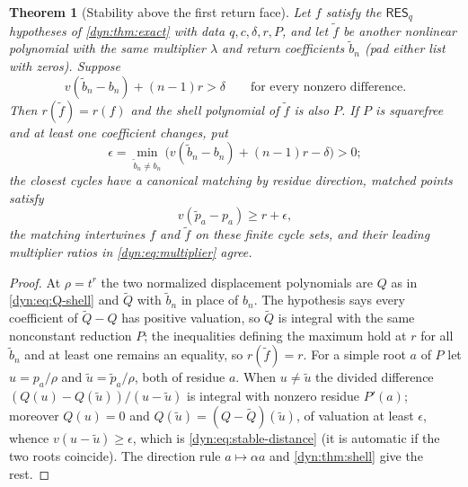 \documentclass[11pt,letterpaper]{article}
\newtheorem{theorem}{Theorem}[section]
\theoremstyle{definition}
\theoremstyle{remark}
\newcommand{\resq}{\mathsf{RES}_q}
\numberwithin{equation}{section}
\begin{document}
\begin{theorem}[Stability above the first return face]\label{dyn:thm:stability}
Let $f$ satisfy the $\resq$ hypotheses of \cref{dyn:thm:exact} with data
$q,c,\delta,r,P$, and let $\widetilde f$ be another nonlinear polynomial
with the \emph{same} multiplier $\lambda$ and return coefficients
$\widetilde b_n$ (pad either list with zeros). Suppose
\begin{equation}\label{dyn:eq:stable-assumption}
 v(\widetilde b_n-b_n)+(n-1)r>\delta
 \qquad\text{for every nonzero difference.}
\end{equation}
Then $r(\widetilde f)=r(f)$ and the shell polynomial of $\widetilde f$ is
also $P$. If $P$ is squarefree and at least one coefficient changes, put
\begin{equation}\label{dyn:eq:epsilon}
 \epsilon=\min_{\widetilde b_n\ne b_n}
 \bigl(v(\widetilde b_n-b_n)+(n-1)r-\delta\bigr)>0 ;
\end{equation}
the closest cycles have a canonical matching by residue direction, matched
points satisfy
\begin{equation}\label{dyn:eq:stable-distance}
 v(\widetilde p_a-p_a)\ge r+\epsilon ,
\end{equation}
the matching intertwines $f$ and $\widetilde f$ on these finite cycle sets,
and their leading multiplier ratios in \eqref{dyn:eq:multiplier} agree.
\end{theorem}
\begin{proof}
At $\rho=t^{r}$ the two normalized displacement polynomials are $Q$ as in
\eqref{dyn:eq:Q-shell} and $\widetilde Q$ with $\widetilde b_n$ in place of
$b_n$. The hypothesis says every coefficient of $\widetilde Q-Q$ has
positive valuation, so $\widetilde Q$ is integral with the same nonconstant
reduction $P$; the inequalities defining the maximum hold at $r$ for all
$\widetilde b_n$ and at least one remains an equality, so
$r(\widetilde f)=r$. For a simple root $a$ of $P$ let $u=p_a/\rho$ and
$\widetilde u=\widetilde p_a/\rho$, both of residue $a$. When
$u\ne\widetilde u$ the divided difference
$(Q(u)-Q(\widetilde u))/(u-\widetilde u)$ is integral with nonzero residue
$P'(a)$; moreover $Q(u)=0$ and
$Q(\widetilde u)=(Q-\widetilde Q)(\widetilde u)$, of valuation at least
$\epsilon$, whence $v(u-\widetilde u)\ge\epsilon$, which is
\eqref{dyn:eq:stable-distance} (it is automatic if the two roots coincide).
The direction rule $a\mapsto\alpha a$ and \cref{dyn:thm:shell} give the
rest.
\end{proof}
\end{document}

